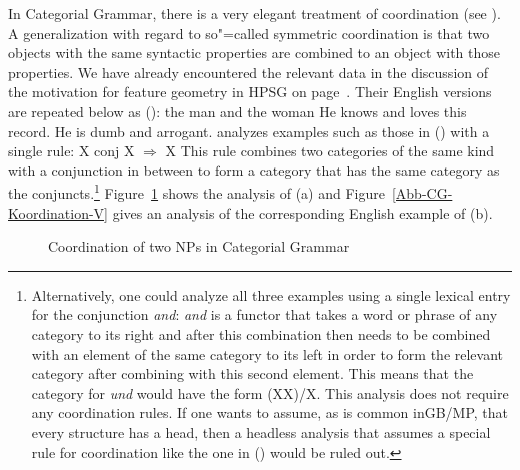 \begin{exe}
\begin{xlist}[iv.]
\begin{exe}
\begin{xlist}[iv.]
In Categorial Grammar, there is a very elegant treatment of coordination (see \citealp{Steedman91a}). 
A generalization with regard to so"=called symmetric coordination is that two objects with the same syntactic properties are combined to an object
with those properties. We have already encountered the relevant data in the discussion of the motivation for feature geometry in HPSG on
page~\pageref{Seite-HPSG-Koordination}. Their English versions are repeated below as ():
\eal
\ex the man and the woman
\ex He knows and loves this record.
\ex He is dumb and arrogant.
\zl
\citet{Steedman91a} analyzes examples such as those in () with a single rule:
\ea
X conj X $\Rightarrow$ X
\z
This rule combines two categories of the same kind with a conjunction in between to form a category that has the same category as the conjuncts.\footnote{%
Alternatively, one could analyze all three examples using a single lexical entry for the conjunction
\emph{and}: \emph{and} is a functor that takes a word or phrase
of any category to its right and after this combination then needs to be combined with an element of the same category to its left in order to form the relevant
category after combining with this second element. This means that the category for \emph{und} would have the form (X\bs X)/X. 
This analysis does not require any coordination rules. If one wants to assume, as is common in\indexgb GB/MP\indexmp, that every structure has a head, then a headless
analysis that assumes a special rule for coordination like the one in () would be ruled out.
}
Figure~\ref{Abb-cg-np-koordination} shows the analysis of (a) and
Figure~\ref{Abb-CG-Koordination-V} gives an analysis of the corresponding English example of
(b).
\begin{figure}
\centerline{%
}
\caption{\label{Abb-cg-np-koordination}Coordination of two NPs in Categorial Grammar}
\end{figure}%


\end{xlist}
\end{exe}
\end{xlist}
\end{exe}
